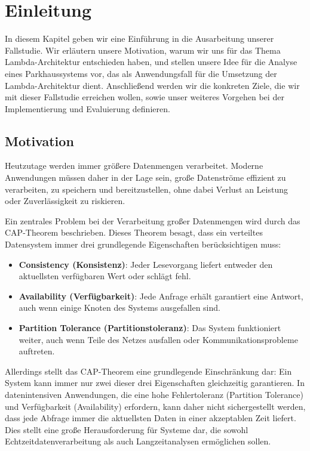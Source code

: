 \chapter{Einleitung}
In diesem Kapitel geben wir eine Einführung in die Ausarbeitung unserer Fallstudie. Wir erläutern unsere Motivation, warum wir uns für das Thema Lambda-Architektur entschieden haben, und stellen unsere Idee für die Analyse eines Parkhaussystems vor, das als Anwendungsfall für die Umsetzung der Lambda-Architektur dient. Anschließend werden wir die konkreten Ziele, die wir mit dieser Fallstudie erreichen wollen, sowie unser weiteres Vorgehen bei der Implementierung und Evaluierung definieren.

\section{Motivation}
Heutzutage werden immer größere Datenmengen verarbeitet. Moderne Anwendungen müssen daher in der Lage sein, große Datenströme effizient zu verarbeiten, zu speichern und bereitzustellen, ohne dabei Verlust an Leistung oder Zuverlässigkeit zu riskieren.

Ein zentrales Problem bei der Verarbeitung großer Datenmengen wird durch das CAP-Theorem beschrieben. Dieses Theorem besagt, dass ein verteiltes Datensystem immer drei grundlegende Eigenschaften berücksichtigen muss:
\begin{itemize}
	\item \textbf{Consistency (Konsistenz)}: Jeder Lesevorgang liefert entweder den aktuellsten verfügbaren Wert oder schlägt fehl.
	\item \textbf{Availability (Verfügbarkeit)}: Jede Anfrage erhält garantiert eine Antwort, auch wenn einige Knoten des Systems ausgefallen sind.
	\item \textbf{Partition Tolerance (Partitionstoleranz)}: Das System funktioniert weiter, auch wenn Teile des Netzes ausfallen oder Kommunikationsprobleme auftreten.
\end{itemize}

Allerdings stellt das CAP-Theorem eine grundlegende Einschränkung dar: Ein System kann immer nur zwei dieser drei Eigenschaften gleichzeitig garantieren. In datenintensiven Anwendungen, die eine hohe Fehlertoleranz (Partition Tolerance) und Verfügbarkeit (Availability) erfordern, kann daher nicht sichergestellt werden, dass jede Abfrage immer die aktuellsten Daten in einer akzeptablen Zeit liefert. Dies stellt eine große Herausforderung für Systeme dar, die sowohl Echtzeitdatenverarbeitung als auch Langzeitanalysen ermöglichen sollen.

